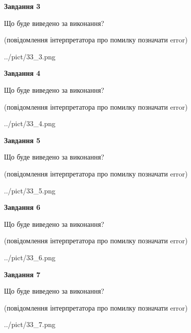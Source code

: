 \documentclass[12pt, ukrainian]{article}
\begin{document}
{\begin {large}
{\begin {center}\textbf{Завдання 3}\end {center}}\par
Що буде виведено за виконання?\par
 (повідомлення інтерпретатора про помилку позначати error)\par
\begin{center}
	{../pict/33_3.png}
\end{center}
\newpage

{\begin {center}\textbf{Завдання 4}\end {center}}\par
Що буде виведено за виконання?\par
 (повідомлення інтерпретатора про помилку позначати error)\par
\begin{center}
	{../pict/33_4.png}
\end{center}
\newpage

{\begin {center}\textbf{Завдання 5}\end {center}}\par
Що буде виведено за виконання?\par
 (повідомлення інтерпретатора про помилку позначати error)\par
\begin{center}
	{../pict/33_5.png}
\end{center}
\newpage

{\begin {center}\textbf{Завдання 6}\end {center}}\par
Що буде виведено за виконання?\par
 (повідомлення інтерпретатора про помилку позначати error)\par
\begin{center}
	{../pict/33_6.png}
\end{center}
\newpage

{\begin {center}\textbf{Завдання 7}\end {center}}\par
Що буде виведено за виконання?\par
 (повідомлення інтерпретатора про помилку позначати error)\par
\begin{center}
	{../pict/33_7.png}
\end{center}
\newpage


\end{large}}
\end{document}
